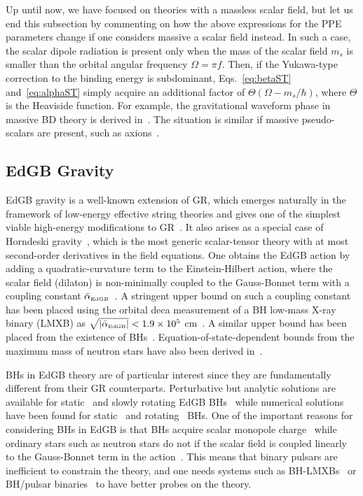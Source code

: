 \documentclass[prd,twocolumn,nofootinbib]{revtex4-1}
\newcommand{\EDGB}{{\mbox{\tiny EdGB}}}
\begin{document}
Up until now, we have focused on theories with a massless scalar field, but let us end this subsection by commenting on how the above expressions for the PPE parameters change if one considers massive a scalar field instead. In such a case, the scalar dipole radiation is present only when the mass of the scalar field $m_s$ is smaller than the orbital angular frequency $\Omega= \pi f$. Then, if the Yukawa-type correction to the binding energy is subdominant, Eqs.~\eqref{eq:betaST} and~\eqref{eq:alphaST} simply acquire an additional factor of $\Theta(\Omega - m_s/\hbar)$, where $\Theta$ is the Heaviside function. For example, the gravitational waveform phase in massive BD theory is derived in~\cite{Berti:2012bp}. The situation is similar if massive pseudo-scalars are present, such as axions~\cite{Huang:2018pbu}.
 
  \subsection{EdGB Gravity}
EdGB gravity is a well-known extension of GR, which emerges naturally in the framework of low-energy effective string theories  and gives one of the simplest viable high-energy modifications to GR~\cite{Moura:2006pz,Pani:2009wy}. It also arises as a special case of Horndeski gravity~\cite{Zhang:2017unx,Berti:2015itd}, which is the most generic scalar-tensor theory with at most second-order derivatives in the field equations. One obtains the EdGB action by adding a quadratic-curvature term to the Einstein-Hilbert action, where the scalar field (dilaton) is non-minimally coupled to the Gauss-Bonnet term with a coupling constant $\bar{\alpha}_\EDGB$~\cite{Kanti:1995vq}. A stringent upper bound on such a coupling constant has been placed using the orbital deca measurement of a BH low-mass X-ray binary (LMXB) as $\sqrt{|\bar{\alpha}_\EDGB|} < 1.9\times10^5$ cm~\cite{Yagi:2012gp}. A similar upper bound has been placed from the existence of BHs~\cite{Pani:2009wy}. Equation-of-state-dependent bounds from the maximum mass of neutron stars have also been derived in~\cite{pani-EDGB-NS}. 


BHs in EdGB theory are of particular interest since they are fundamentally different from their GR counterparts. Perturbative but analytic solutions are available for static~\cite{Mignemi:1992nt,Mignemi:1993ce,Yunes:2011we,Sotiriou:2014pfa} and slowly rotating EdGB BHs~\cite{Pani:2011gy,Ayzenberg:2014aka,Maselli:2015tta} while numerical solutions have been found for static~\cite{Kanti:1995vq,Torii:1996yi,Alexeev:1996vs} and rotating~\cite{Pani:2009wy,Kleihaus:2011tg,Kleihaus:2014lba} BHs. One of the important reasons for considering BHs in EdGB is that BHs acquire scalar monopole charge~\cite{Yagi:2011xp,Sotiriou:2014pfa,Berti:2018cxi,Prabhu:2018aun} while ordinary stars such as neutron stars do not if the scalar field is coupled linearly to the Gauss-Bonnet term in the action~\cite{Yagi:2011xp,Yagi:2015oca}. This means that binary pulsars are inefficient to constrain the theory, and one needs systems such as BH-LMXBs~\cite{Yagi:2012gp} or BH/pulsar binaries~\cite{Yagi:2015oca} to have better probes on the theory.
\end{document}

